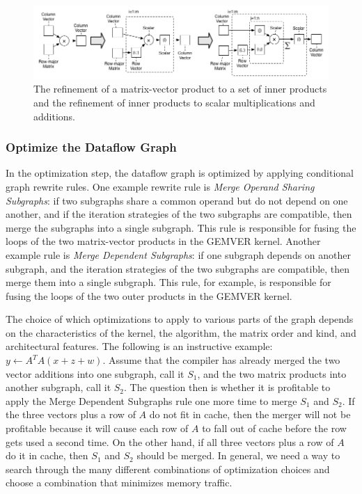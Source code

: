 \documentclass[runningheads]{llncs}
\begin{document}
\begin{figure}[hbtp]
  \centering
  \includegraphics[width=\textwidth]{figures/refine-mv-dot.png}

  \caption{The refinement of a matrix-vector product to a set of inner products and the refinement of inner products to scalar multiplications and additions.}
  \label{fig:refine-mv-dot}
\end{figure}




\subsubsection{Optimize the Dataflow Graph}

In the optimization step, the dataflow graph is optimized by applying conditional graph rewrite rules.  One example rewrite rule is \emph{Merge Operand Sharing Subgraphs}: if two subgraphs share a common operand but do not depend on one another, and if the iteration strategies of the two subgraphs are compatible, then merge the subgraphs into a single subgraph.  This rule is responsible for fusing the loops of the two matrix-vector products in the GEMVER kernel.  Another example rule is \emph{Merge Dependent Subgraphs}: if one subgraph depends on another subgraph, and the iteration strategies of the two subgraphs are compatible, then merge them into a single subgraph.  This rule, for example, is responsible for fusing the loops of the two outer products in the GEMVER kernel.

The choice of which optimizations to apply to various parts of the graph depends on the characteristics of the kernel, the algorithm, the matrix order and kind, and architectural features.  The following is an instructive example: $y \gets A^T A (x + z + w)$.  Assume that the compiler has already merged the two vector additions into one subgraph, call it $S_1$, and the two matrix products into another subgraph, call it $S_2$. The question then is whether it is profitable to apply the Merge Dependent Subgraphs rule one more time to merge $S_1$ and $S_2$. If the three vectors plus a row of $A$ do not fit in cache, then the merger will not be profitable because it will cause each row of $A$ to fall out of cache before the row gets used a second time.  On the other hand, if all three vectors plus a row of $A$ do it in cache, then $S_1$ and $S_2$ should be merged.  In general, we need a way to search through the many different combinations of optimization choices and choose a combination that minimizes memory traffic.
\end{document}
